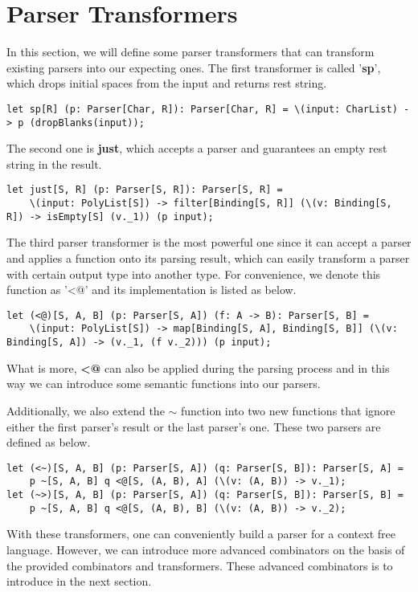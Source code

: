 \section{Parser Transformers}
In this section, we will define some parser transformers that can transform existing parsers into our expecting ones. The first transformer is called '\textbf{sp}', which drops initial spaces from the input and returns rest string.
\begin{lstlisting}
let sp[R] (p: Parser[Char, R]): Parser[Char, R] = \(input: CharList) -> p (dropBlanks(input));
\end{lstlisting}
The second one is \textbf{just}, which accepts a parser and guarantees an empty rest string in the result.
\begin{lstlisting}
let just[S, R] (p: Parser[S, R]): Parser[S, R] =
	\(input: PolyList[S]) -> filter[Binding[S, R]] (\(v: Binding[S, R]) -> isEmpty[S] (v._1)) (p input);
\end{lstlisting}
The third parser transformer is the most powerful one since it can accept a parser and applies a function onto its parsing result, which can easily transform a parser with certain output type into another type. For convenience, we denote this function as '<@' and its implementation is listed as below.
\begin{lstlisting}
let (<@)[S, A, B] (p: Parser[S, A]) (f: A -> B): Parser[S, B] =
	\(input: PolyList[S]) -> map[Binding[S, A], Binding[S, B]] (\(v: Binding[S, A]) -> (v._1, (f v._2))) (p input);
\end{lstlisting}
What is more, \textbf{<@} can also be applied during the parsing process and in this way we can introduce some semantic functions into our parsers.

Additionally, we also extend the \textbf{$\sim$} function into two new functions that ignore either the first parser's result or the last parser's one. These two parsers are defined as below.
\begin{lstlisting}
let (<~)[S, A, B] (p: Parser[S, A]) (q: Parser[S, B]): Parser[S, A] =
	p ~[S, A, B] q <@[S, (A, B), A] (\(v: (A, B)) -> v._1);
let (~>)[S, A, B] (p: Parser[S, A]) (q: Parser[S, B]): Parser[S, B] =
	p ~[S, A, B] q <@[S, (A, B), B] (\(v: (A, B)) -> v._2);
\end{lstlisting}
With these transformers, one can conveniently build a parser for a context free language. However, we can introduce more advanced combinators on the basis of the provided combinators and transformers. These advanced combinators is to introduce in the next section.

